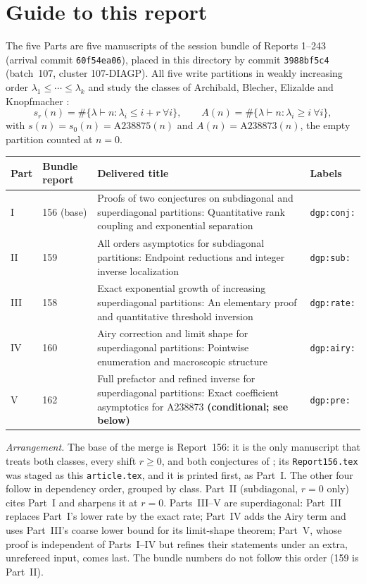 \documentclass[11pt,letterpaper]{article}
\numberwithin{equation}{section}
\theoremstyle{remark}\newtheorem{remark}[theorem]{Remark}
\newcommand{\file}[1]{\nolinkurl{#1}}
\begin{document}
\section*{Guide to this report}\label{dgp:sec:guide}
The five Parts are five manuscripts of the session bundle of Reports 1--243 (arrival commit \texttt{60f54ea06}), placed in this directory by commit \texttt{3988bf5c4} (batch~107, cluster 107-DIAGP). All five write partitions in weakly increasing order $\lambda_1\le\cdots\le\lambda_k$ and study the classes of Archibald, Blecher, Elizalde and Knopfmacher \cite{abek}:
\[
 s_r(n)=\#\{\lambda\vdash n:\lambda_i\le i+r\ \forall i\},\qquad A(n)=\#\{\lambda\vdash n:\lambda_i\ge i\ \forall i\},
\]
with $s(n)=s_0(n)=\mathrm{A238875}(n)$ and $A(n)=\mathrm{A238873}(n)$, the empty partition counted at $n=0$.
\begin{center}
\small
\begin{tabular}{@{}l l >{\raggedright\arraybackslash}p{} l@{}}
\toprule
Part & Bundle report & Delivered title & Labels\\
\midrule
I & 156 (base) & Proofs of two conjectures on subdiagonal and superdiagonal partitions: Quantitative rank coupling and exponential separation & \texttt{dgp:conj:}\\
II & 159 & All orders asymptotics for subdiagonal partitions: Endpoint reductions and integer inverse localization & \texttt{dgp:sub:}\\
III & 158 & Exact exponential growth of increasing superdiagonal partitions: An elementary proof and quantitative threshold inversion & \texttt{dgp:rate:}\\
IV & 160 & Airy correction and limit shape for superdiagonal partitions: Pointwise enumeration and macroscopic structure & \texttt{dgp:airy:}\\
V & 162 & Full prefactor and refined inverse for superdiagonal partitions: Exact coefficient asymptotics for A238873 \textbf{(conditional; see below)} & \texttt{dgp:pre:}\\
\bottomrule
\end{tabular}
\end{center}
\emph{Arrangement.} The base of the merge is Report~156: it is the only manuscript that treats both classes, every shift $r\ge0$, and both conjectures of \cite[Section~5]{abek}; its \file{Report156.tex} was staged as this \file{article.tex}, and it is printed first, as Part~I. The other four follow in dependency order, grouped by class. Part~II (subdiagonal, $r=0$ only) cites Part~I and sharpens it at $r=0$. Parts~III--V are superdiagonal: Part~III replaces Part~I's lower rate by the exact rate; Part~IV adds the Airy term and uses Part~III's coarse lower bound for its limit-shape theorem; Part~V, whose proof is independent of Parts~I--IV but refines their statements under an extra, unrefereed input, comes last. The bundle numbers do not follow this order (159 is Part~II).
\end{document}
